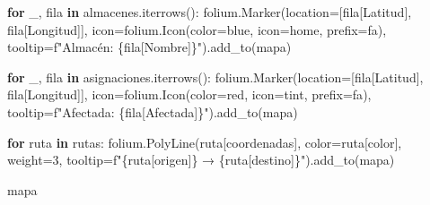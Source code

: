 \documentclass[
  spanish,
  us-letterpaper,
]{scrreprt}
\newenvironment{Shaded}{\begin{snugshade}}{\end{snugshade}}
\newcommand{\ControlFlowTok}[1]{\textcolor[rgb]{0.00,0.23,0.31}{\textbf{#1}}}
\newcommand{\DecValTok}[1]{\textcolor[rgb]{0.68,0.00,0.00}{#1}}
\newcommand{\KeywordTok}[1]{\textcolor[rgb]{0.00,0.23,0.31}{\textbf{#1}}}
\newcommand{\NormalTok}[1]{\textcolor[rgb]{0.00,0.23,0.31}{#1}}
\newcommand{\OperatorTok}[1]{\textcolor[rgb]{0.37,0.37,0.37}{#1}}
\newcommand{\SpecialCharTok}[1]{\textcolor[rgb]{0.37,0.37,0.37}{#1}}
\newcommand{\SpecialStringTok}[1]{\textcolor[rgb]{0.13,0.47,0.30}{#1}}
\newcommand{\StringTok}[1]{\textcolor[rgb]{0.13,0.47,0.30}{#1}}
\numberwithin{equation}{section}
\begin{document}
\begin{Shaded}
\begin{Highlighting}[]
\ControlFlowTok{for}\NormalTok{ \_, fila }\KeywordTok{in}\NormalTok{ almacenes.iterrows():}
\NormalTok{    folium.Marker(location}\OperatorTok{=}\NormalTok{[fila[}\StringTok{\textquotesingle{}Latitud\textquotesingle{}}\NormalTok{],}
\NormalTok{     fila[}\StringTok{\textquotesingle{}Longitud\textquotesingle{}}\NormalTok{]],}
\NormalTok{                  icon}\OperatorTok{=}\NormalTok{folium.Icon(color}\OperatorTok{=}\StringTok{\textquotesingle{}blue\textquotesingle{}}\NormalTok{,}
\NormalTok{                   icon}\OperatorTok{=}\StringTok{\textquotesingle{}home\textquotesingle{}}\NormalTok{, prefix}\OperatorTok{=}\StringTok{\textquotesingle{}fa\textquotesingle{}}\NormalTok{),}
\NormalTok{                  tooltip}\OperatorTok{=}\SpecialStringTok{f"Almacén: }\SpecialCharTok{\{}\NormalTok{fila[}\StringTok{\textquotesingle{}Nombre\textquotesingle{}}\NormalTok{]}\SpecialCharTok{\}}\SpecialStringTok{"}\NormalTok{).add\_to(mapa)}

\ControlFlowTok{for}\NormalTok{ \_, fila }\KeywordTok{in}\NormalTok{ asignaciones.iterrows():}
\NormalTok{    folium.Marker(location}\OperatorTok{=}\NormalTok{[fila[}\StringTok{\textquotesingle{}Latitud\textquotesingle{}}\NormalTok{],}
\NormalTok{     fila[}\StringTok{\textquotesingle{}Longitud\textquotesingle{}}\NormalTok{]],}
\NormalTok{            icon}\OperatorTok{=}\NormalTok{folium.Icon(color}\OperatorTok{=}\StringTok{\textquotesingle{}red\textquotesingle{}}\NormalTok{,}
\NormalTok{                icon}\OperatorTok{=}\StringTok{\textquotesingle{}tint\textquotesingle{}}\NormalTok{, prefix}\OperatorTok{=}\StringTok{\textquotesingle{}fa\textquotesingle{}}\NormalTok{),}
\NormalTok{            tooltip}\OperatorTok{=}\SpecialStringTok{f"Afectada: }\SpecialCharTok{\{}\NormalTok{fila[}\StringTok{\textquotesingle{}Afectada\textquotesingle{}}\NormalTok{]}\SpecialCharTok{\}}\SpecialStringTok{"}\NormalTok{).add\_to(mapa)}

\ControlFlowTok{for}\NormalTok{ ruta }\KeywordTok{in}\NormalTok{ rutas:}
\NormalTok{    folium.PolyLine(ruta[}\StringTok{\textquotesingle{}coordenadas\textquotesingle{}}\NormalTok{], color}\OperatorTok{=}\NormalTok{ruta[}\StringTok{\textquotesingle{}color\textquotesingle{}}\NormalTok{], weight}\OperatorTok{=}\DecValTok{3}\NormalTok{,}
\NormalTok{        tooltip}\OperatorTok{=}\SpecialStringTok{f"}\SpecialCharTok{\{}\NormalTok{ruta[}\StringTok{\textquotesingle{}origen\textquotesingle{}}\NormalTok{]}\SpecialCharTok{\}}\SpecialStringTok{ → }\SpecialCharTok{\{}\NormalTok{ruta[}\StringTok{\textquotesingle{}destino\textquotesingle{}}\NormalTok{]}\SpecialCharTok{\}}\SpecialStringTok{"}\NormalTok{).add\_to(mapa)}

\NormalTok{mapa}
\end{Highlighting}
\end{Shaded}
\end{document}

